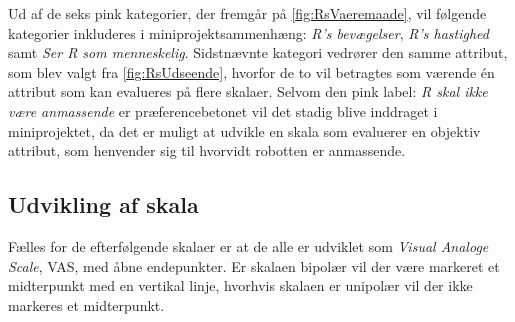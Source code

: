 \noindent
%
Ud af de seks pink kategorier, der fremgår på \autoref{fig:RsVaeremaade}, vil følgende kategorier inkluderes i miniprojektsammenhæng: \textit{R's bevægelser}, \textit{R's hastighed} samt \textit{Ser R som menneskelig}. Sidstnævnte kategori vedrører den samme attribut, som blev valgt fra \autoref{fig:RsUdseende}, hvorfor de to vil betragtes som værende én attribut som kan evalueres på flere skalaer. Selvom den pink label: \textit{R skal ikke være anmassende} er præferencebetonet vil det stadig blive inddraget i miniprojektet, da det er muligt at udvikle en skala som evaluerer en objektiv attribut, som henvender sig til hvorvidt robotten er anmassende.  

\subsection*{Udvikling af skala}
\label{UdviklingSkala}
%
Fælles for de efterfølgende skalaer er at de alle er udviklet som \textit{Visual Analoge Scale}, VAS, med åbne endepunkter. Er skalaen bipolær vil der være markeret et midterpunkt med en vertikal linje, hvorhvis skalaen er unipolær vil der ikke markeres et midterpunkt. 

